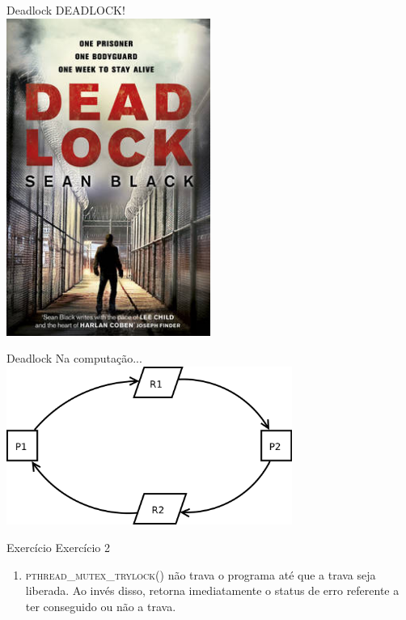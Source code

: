 \documentclass{beamer}
\begin{document}
\begin{frame}[fragile]{Deadlock}
  \centering
  \LARGE
  DEADLOCK!\\
  \includegraphics[width=0.5\textwidth]{Deadlock2.jpg}
\end{frame}

\begin{frame}[fragile]{Deadlock}
  \centering
  \Large
  Na computação...\\
  \includegraphics[width=0.7\textwidth]{deadlock_processos.png}
\end{frame}

\begin{frame}[fragile]{Exercício}
  \centering
  \Large
  Exercício 2
  \begin{enumerate}
    \item <2-> \textsc{pthread\_mutex\_trylock()} não trava o programa até que
      a trava seja liberada. Ao invés disso, retorna imediatamente o status de
      erro referente a ter conseguido ou não a trava.
  \end{enumerate}
\end{frame}
\end{document}
